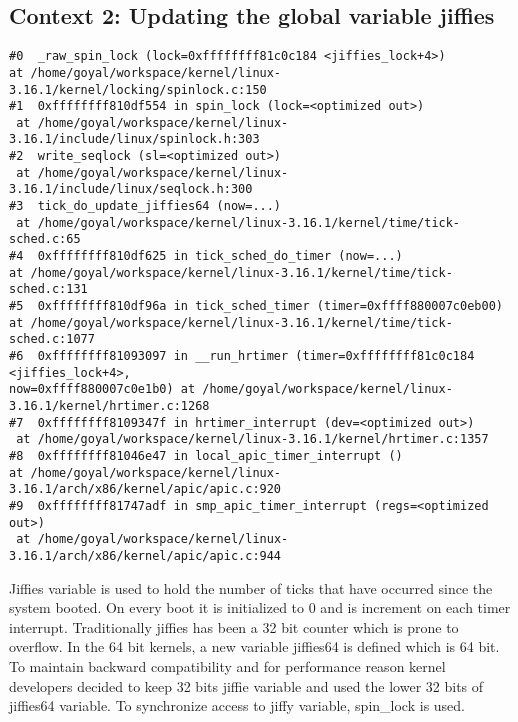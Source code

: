 \documentclass[10pt] {article}
\begin{document}
\subsection{Context 2: Updating the global variable jiffies}
\begin{lstlisting}
#0  _raw_spin_lock (lock=0xffffffff81c0c184 <jiffies_lock+4>) 
at /home/goyal/workspace/kernel/linux-3.16.1/kernel/locking/spinlock.c:150
#1  0xffffffff810df554 in spin_lock (lock=<optimized out>)
 at /home/goyal/workspace/kernel/linux-3.16.1/include/linux/spinlock.h:303
#2  write_seqlock (sl=<optimized out>)
 at /home/goyal/workspace/kernel/linux-3.16.1/include/linux/seqlock.h:300
#3  tick_do_update_jiffies64 (now=...)
 at /home/goyal/workspace/kernel/linux-3.16.1/kernel/time/tick-sched.c:65
#4  0xffffffff810df625 in tick_sched_do_timer (now=...) 
at /home/goyal/workspace/kernel/linux-3.16.1/kernel/time/tick-sched.c:131
#5  0xffffffff810df96a in tick_sched_timer (timer=0xffff880007c0eb00) 
at /home/goyal/workspace/kernel/linux-3.16.1/kernel/time/tick-sched.c:1077
#6  0xffffffff81093097 in __run_hrtimer (timer=0xffffffff81c0c184 <jiffies_lock+4>, 
now=0xffff880007c0e1b0) at /home/goyal/workspace/kernel/linux-3.16.1/kernel/hrtimer.c:1268
#7  0xffffffff8109347f in hrtimer_interrupt (dev=<optimized out>)
 at /home/goyal/workspace/kernel/linux-3.16.1/kernel/hrtimer.c:1357
#8  0xffffffff81046e47 in local_apic_timer_interrupt () 
at /home/goyal/workspace/kernel/linux-3.16.1/arch/x86/kernel/apic/apic.c:920
#9  0xffffffff81747adf in smp_apic_timer_interrupt (regs=<optimized out>)
 at /home/goyal/workspace/kernel/linux-3.16.1/arch/x86/kernel/apic/apic.c:944
\end{lstlisting}

\noindent Jiffies variable is used to hold the number of ticks that have occurred since the system booted. On every boot it is initialized to 0 and is increment on each timer interrupt. Traditionally jiffies has been a 32 bit counter which is prone to overflow. In the 64 bit kernels, a new variable jiffies64 is defined which is 64 bit. To maintain backward compatibility and for performance reason kernel developers decided to keep 32 bits jiffie variable and used the lower 32 bits of jiffies64 variable. To synchronize access to jiffy variable, spin\_lock is used.\\

\end{document}
